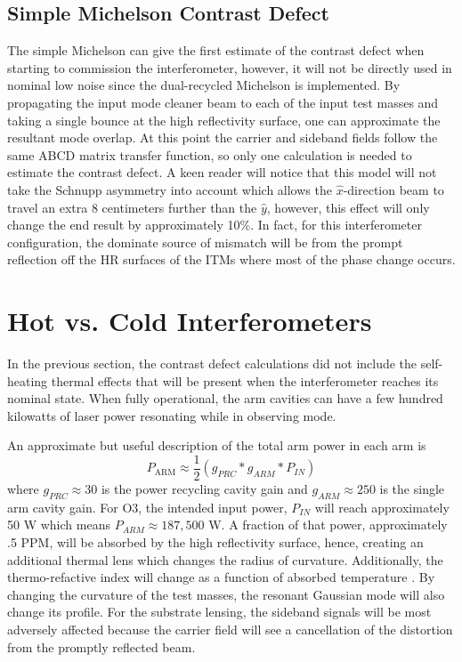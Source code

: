 	\subsection{Simple Michelson Contrast Defect}
	The simple Michelson can give the first estimate of the contrast defect when starting to commission the interferometer, however, it will not be directly used in nominal low noise since the dual-recycled Michelson is implemented.  By propagating the input mode cleaner beam to each of the input test masses and taking a single bounce at the high reflectivity surface, one can approximate the resultant mode overlap.  At this point the carrier and sideband fields follow the same ABCD matrix transfer function, so only one calculation is needed to estimate the contrast defect.  A keen reader will notice that this model will not take the Schnupp asymmetry into account which allows the $\hat{x}$-direction beam to travel an extra 8 centimeters further than the $\hat{y}$, however, this effect will only change the end result by approximately 10$\%$.  In fact, for this interferometer configuration, the dominate source of mismatch will be from the prompt reflection off the HR surfaces of the ITMs where most of the phase change occurs.
	
	\section{Hot vs. Cold Interferometers}\label{sec:hotcoldifo}
	In the previous section, the contrast defect calculations did not include the self-heating thermal effects that will be present when the interferometer reaches its nominal state.  When fully operational, the arm cavities can have a few hundred kilowatts of laser power resonating while in observing mode. 
	
	An approximate but useful description of the total arm power in each arm is
	\begin{equation}
		P_{\text{ARM}} \approx \frac{1}{2} (g_{PRC} * g_{ARM} * P_{IN})
	\end{equation}
	where $g_{PRC} \approx 30$ is the power recycling cavity gain and $g_{ARM} \approx 250$ is the single arm cavity gain. For O3, the intended input power, $P_{IN}$ will reach approximately 50 W which means $P_{ARM} \approx 187,500$ W. A fraction of that power, approximately .5 PPM, will be absorbed by the high reflectivity surface, hence, creating an additional thermal lens which changes the radius of curvature.  Additionally, the thermo-refactive index will change as a function of absorbed temperature \cite{winkler_thermaldist}.  By changing the curvature of the test masses, the resonant Gaussian mode will also change its profile. For the substrate lensing, the sideband signals will be most adversely affected because the carrier field will see a cancellation of the distortion from the promptly reflected beam.
	
